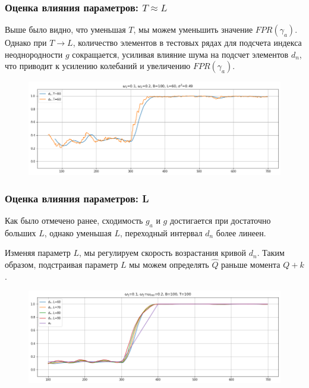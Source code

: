 \documentclass[11pt]{beamer}
\begin{document}
	\begin{frame}
		\frametitle{Оценка влияния параметров: $ T \approx L $}
		Выше было видно, что уменьшая $ T $, мы можем уменьшить значение $ FPR(\gamma_a) $. Однако при $ T \rightarrow L $, количество элементов в тестовых рядах для подсчета индекса неоднородности $ g $ сокращается, усиливая влияние шума на подсчет элементов $ d_{n} $, что приводит к усилению колебаний и увеличению $ FPR(\gamma_a) $.
		
		\begin{figure}[b]
			\centering
			\includegraphics[width=\linewidth]{imgs/decreasing_T.png}
		\end{figure}
	\end{frame}
	
	\begin{frame}
		\frametitle{Оценка влияния параметров: L}
		Как было отмечено ранее, сходимость $ g_a $ и $ g $ достигается при достаточно больших $ L $, однако уменьшая $ L $, переходный интервал $ d_n $ более линеен.
		
		\bigskip
		
		Изменяя параметр $ L $, мы регулируем скорость возрастания кривой $ d_{n} $. Таким образом, подстраивая параметр $ L $ мы можем определять $ \hat{Q} $ раньше момента $ Q + k $.
		
		\begin{figure}[b]
			\centering
			\includegraphics[width=\linewidth]{imgs/row_diff_L.png}
		\end{figure}
		
		
	\end{frame}
	
\end{document}
